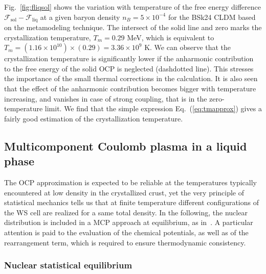 Fig.~\ref{fig:fliqsol} shows the variation with temperature of the free energy
difference $\mathcal{F}_{\text{sol}}-\mathcal{F}_{\text{liq}}$ at a given
baryon density $n_B = 5\times 10^{-4}$ for the BSk24 CLDM based on the 
metamodeling technique. The intersect of the solid line and zero marks
the crystallization temperature, $T_m = 0.29$ MeV, which is equivalent to $T_m
= (1.16\times 10^{10}) \times (0.29) = 3.36 \times 10^9$ K. We can observe that
the crystallization temperature is significantly lower if the 
anharmonic contribution to the free energy of the solid OCP is neglected 
(dashdotted line). This stresses the importance of the small thermal
corrections in the calculation. It is also seen that the effect of the 
anharmonic contribution becomes bigger with temperature increasing, and 
vanishes in case of strong coupling, that is in the zero-temperature limit. We
find that the simple expression Eq.~(\ref{eq:tmapprox}) gives a fairly good
estimation of the crystallization temperature.

\subsection{Multicomponent Coulomb plasma in a liquid phase}\label{subsec:mcp}

The OCP approximation is expected to be reliable at the temperatures
typically encountered at low density in the crystallized crust, yet the 
very principle of statistical mechanics tells us that at finite temperature 
different configurations of the WS cell are realized for a same total density.
In the following, the nuclear distribution is included in a MCP approach at 
equilibrium, as in~\cite{Fantina2020,Carreau2020}. A 
particular attention is paid to the evaluation of the chemical potentials, as 
well as of the rearrangement term, which is required to ensure thermodynamic 
consistency. 

\subsubsection{Nuclear statistical equilibrium}

